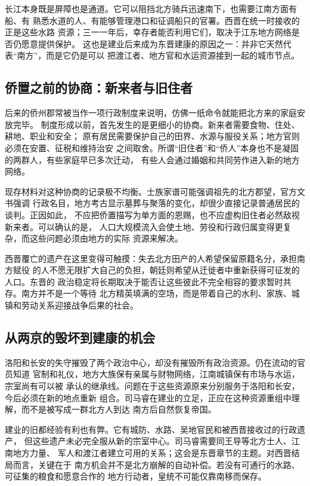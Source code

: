 长江本身既是屏障也是通道。它可以阻挡北方骑兵迅速南下，也需要江南方面有船、有
熟悉水道的人、有能够管理港口和征调船只的官署。西晋在统一时接收的正是这些水路
资源；三一一年后，幸存者能否利用它们，取决于江东地方网络是否仍愿意提供保护。
这也是建业后来成为东晋建康的原因之一：并非它天然代表“南方”，而是它仍是可以
把渡江者、地方官和水运资源接到一起的城市节点。

\subsection{侨置之前的协商：新来者与旧住者}

后来的侨州郡常被当作一项行政制度来说明，仿佛一纸命令就能把北方来的家庭安放完毕。
制度形成以前，首先发生的是更细小的协商。新来者需要食物、住处、耕地、职业和安全；
原有居民需要保护自己的田界、水源与服役关系；地方官则必须在安置、征税和维持治安
之间取舍。所谓“旧住者”和“侨人”本身也不是凝固的两群人，有些家庭早已多次迁动，
有些人会通过婚姻和共同劳作进入新的地方网络。

现存材料对这种协商的记录极不均衡。士族家谱可能强调祖先的北方郡望，官方文书强调
行政名目，地方考古显示墓葬与聚落的变化，却很少直接记录普通居民的谈判。正因如此，
不应把侨置描写为单方面的恩赐，也不应虚构旧住者必然敌视新来者。可以确认的是，
人口大规模流入会使土地、劳役和行政归属变得更复杂，而这些问题必须由地方的实际
资源来解决。

西晋覆亡的遗产在这里变得可触摸：失去北方田产的人希望保留原籍名分，承担南方赋役
的人不愿无限扩大自己的负担，朝廷则希望从迁徙者中重新获得可征发的人口。东晋的
政治稳定将长期取决于能否让这些彼此不完全相容的要求暂时共存。南方并不是一个等待
北方精英填满的空场，而是带着自己的水利、家族、城镇和劳动关系迎接战争后果的社会。

\subsection{从两京的毁坏到建康的机会}

洛阳和长安的失守摧毁了两个政治中心，却没有摧毁所有政治资源。仍在流动的官员知道
官制和礼仪，地方大族保有亲属与财物网络，江南城镇保有市场与水运，宗室尚有可以被
承认的继承线。问题在于这些资源原来分别服务于洛阳和长安，今后必须在新的地点重新
组合。司马睿在建业的立足，正应在这种资源重组中理解，而不是被写成一群北方人到达
南方后自然恢复帝国。

建业的旧都经验有利也有弊。它有城防、水路、吴地官民和被西晋接收过的行政遗产，
但这些遗产未必完全服从新的宗室中心。司马睿需要同王导等北方士人、江南地方力量、
军人和渡江者建立可用的关系；这会是东晋章节的主题。对西晋结局而言，关键在于
南方机会并不是北方崩解的自动补偿。若没有可通行的水路、可征集的粮食和愿意合作的
地方行动者，皇统不可能仅靠南移而保存。

